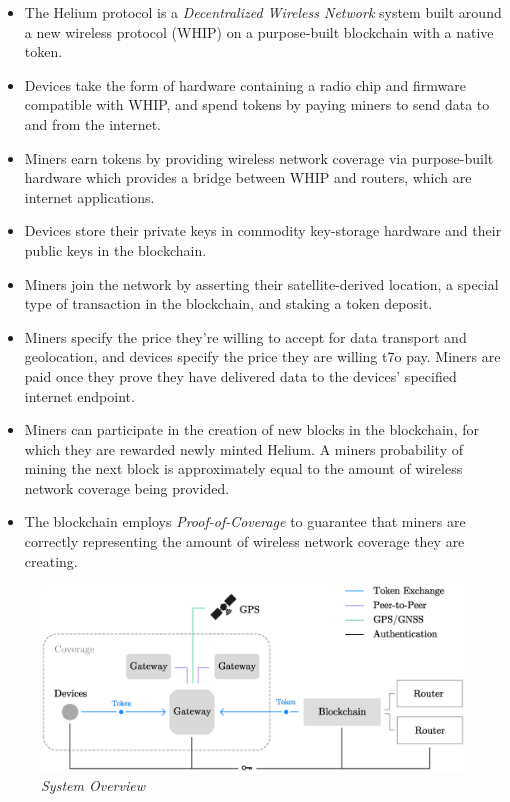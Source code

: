 \documentclass[letterpaper,11pt]{article}
\begin{document}
\begin{itemize}
    \item The Helium protocol is a \emph{Decentralized Wireless Network} system built around a new wireless protocol (WHIP) on a purpose-built blockchain with a native token.
    \item Devices take the form of hardware containing a radio chip and firmware compatible with WHIP, and spend tokens by paying miners to send data to and from the internet.
    \item Miners earn tokens by providing wireless network coverage via purpose-built hardware which provides a bridge between WHIP and routers, which are internet applications.
    \item Devices store their private keys in commodity key-storage hardware and their public keys in the blockchain.
    \item Miners join the network by asserting their satellite-derived location, a special type of transaction in the blockchain, and staking a token deposit.
    \item Miners specify the price they're willing to accept for data transport and geolocation, and devices specify the price they are willing t7o pay. Miners are paid once they prove they have delivered data to the devices' specified internet endpoint.
    \item Miners can participate in the creation of new blocks in the blockchain, for which they are rewarded newly minted Helium. A miners probability of mining the next block is approximately equal to the amount of wireless network coverage being provided.
    \item The blockchain employs \emph{Proof-of-Coverage} to guarantee that miners are correctly representing the amount of wireless network coverage they are creating.
\end{itemize}

\begin{figure}[H]
    \begin{center}
          \includegraphics[width=\textwidth]{diagram1.eps}
          \caption{\emph{System Overview}}
          \label{fig:system}
     \end{center}
\end{figure}
\end{document}

